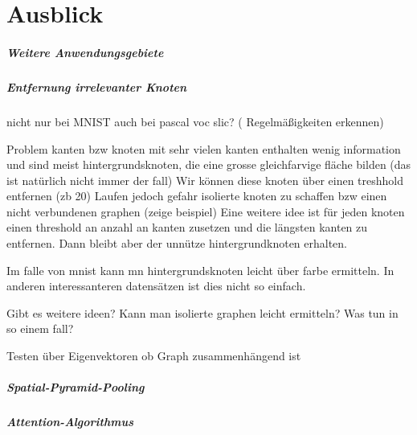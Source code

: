 \chapter{Ausblick}
\label{ausblick}

\paragraph{Weitere Anwendungsgebiete}
\label{weitere_anwendungsgebiete}

\paragraph{Entfernung irrelevanter Knoten}
\label{entfernung_irrelevanter_knoten}

nicht nur bei MNIST
auch bei pascal voc slic? (\zB{} Regelmäßigkeiten erkennen)

Problem kanten bzw knoten mit sehr vielen kanten enthalten wenig information und sind meist hintergrundsknoten, die eine grosse gleichfarvige fläche bilden (das ist natürlich nicht immer der fall)
Wir können diese knoten über einen treshhold entfernen (zb 20)
Laufen jedoch gefahr isolierte knoten zu schaffen bzw einen nicht verbundenen graphen (zeige beispiel)
 Eine weitere idee ist für jeden knoten einen threshold an anzahl an kanten zusetzen und die längsten kanten zu entfernen. Dann bleibt aber der unnütze hintergrundknoten erhalten.

Im falle von mnist kann mn hintergrundsknoten leicht über farbe ermitteln.
In anderen interessanteren datensätzen ist dies nicht so einfach.

Gibt es weitere ideen?
Kann man isolierte graphen leicht ermitteln? Was tun in so einem fall?

Testen über Eigenvektoren ob Graph zusammenhängend ist

\paragraph{Spatial-Pyramid-Pooling}
\label{spatial_pyramid_pooling}

\paragraph{Attention-Algorithmus}
\label{attention_algorithmus}
